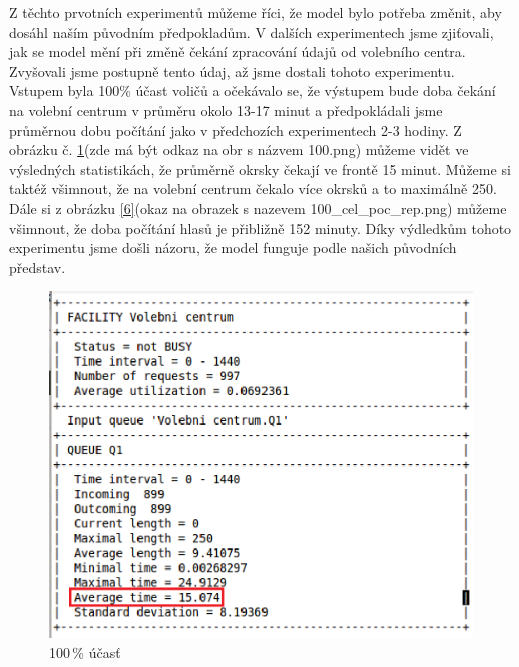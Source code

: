 \documentclass[12pt,a4paper,titlepage,final]{article}
\begin{document}
\newline
\newline
Z těchto prvotních experimentů můžeme říci, že model bylo potřeba změnit, aby dosáhl naším původním předpokladům. V dalších experimentech jsme zjiťovali, jak se model mění při změně čekání zpracování údajů od volebního centra. Zvyšovali jsme postupně tento údaj, až jsme dostali tohoto experimentu.
\newpage
Vstupem byla 100\% účast voličů a očekávalo se, že výstupem bude doba čekání na volební centrum v průměru okolo 13-17 minut a předpokládali jsme průměrnou dobu počítání jako v předchozích experimentech 2-3 hodiny. Z obrázku č. \ref{obr5}(zde má být odkaz na obr s názvem 100.png)  můžeme vidět ve výsledných statistikách, že průměrně okrsky čekají ve frontě 15 minut. Můžeme si taktéž všimnout, že na volební centrum čekalo více okrsků a to maximálně 250. Dále si z obrázku \ref{6}(okaz na obrazek s nazevem 100\_cel\_poc\_rep.png) můžeme všimnout, že doba počítání hlasů je přibližně 152 minuty. Díky výdledkům tohoto experimentu jsme došli názoru, že model funguje podle našich původních představ.
\newline
\newline
\begin{figure}[h]

\begin{center}

\includegraphics[scale=0.7]{img/100.eps} 
\caption{100\,\% účasť}
\label{obr5}

\end{center}

\end{figure}
\end{document}
